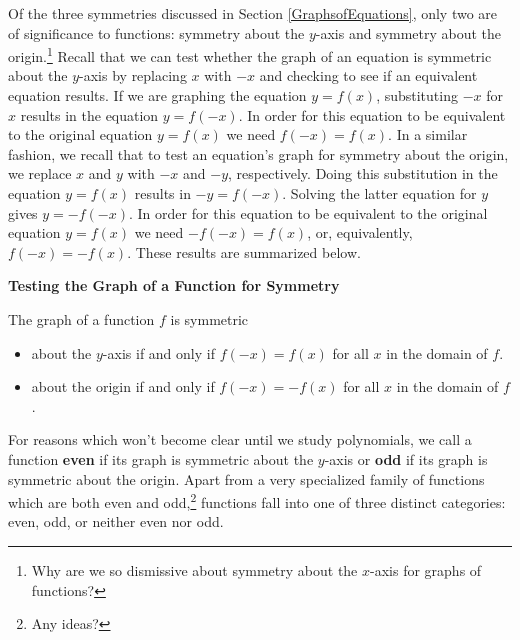 \medskip

Of the three symmetries discussed in Section \ref{GraphsofEquations}, only two are of significance to functions:  symmetry about the $y$-axis and symmetry about the origin.\footnote{Why are we so dismissive about symmetry about the $x$-axis for graphs of functions?}  Recall that we can test whether the graph of an equation is symmetric about the $y$-axis by replacing $x$ with $-x$ and checking to see if an equivalent equation results.  If we are graphing the equation $y=f(x)$, substituting $-x$ for $x$ results in the equation $y=f(-x)$.  In order for this equation to be equivalent to the original equation $y=f(x)$ we need $f(-x) = f(x)$.  In a similar fashion, we recall that to test an equation's graph for symmetry about the origin, we replace $x$ and $y$ with $-x$ and $-y$, respectively.  Doing this substitution in the equation $y = f(x)$ results in $-y = f(-x)$.  Solving the latter equation for $y$ gives $y = -f(-x)$.  In order for this equation to be equivalent to the original equation $y=f(x)$ we need $-f(-x) = f(x)$, or, equivalently, $f(-x) = -f(x)$.  These results are summarized below.

\medskip

\colorbox{ResultColor}{\bbm


\centerline{\textbf{Testing the Graph of a Function for Symmetry}}

\smallskip

\hspace{.17in} The graph of a function $f$ is symmetric 

\begin{itemize}

\item  about the $y$-axis if and only if $f(-x) = f(x)$ for all $x$ in the domain of $f$.

\item  about the origin if and only if $f(-x) = -f(x)$ for all $x$ in the domain of $f$.

\end{itemize}

\ebm}

\medskip

For reasons which won't become clear until we study polynomials, we call a function \textbf{even} if its graph is symmetric about the $y$-axis or \textbf{odd} if its graph is symmetric about the origin.  Apart from a very specialized family of functions which are both even and odd,\footnote{Any ideas?} functions fall into one of three distinct categories: even, odd, or neither even nor odd.  

